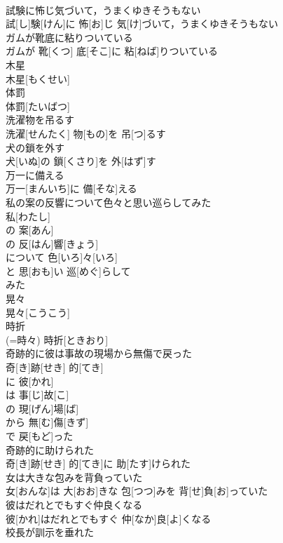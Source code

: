 \documentclass[8pt]{extreport}
\begin{document}
\begin{CJK}{UTF8}{min}
\\	試験に怖じ気づいて，うまくゆきそうもない	
\\	試[し]験[けん]に 怖[お]じ 気[け]づいて，うまくゆきそうもない
\\	ガムが靴底に粘りついている	
\\	ガムが 靴[くつ] 底[そこ]に 粘[ねば]りついている
\\	木星	
\\	木星[もくせい]
\\	体罰	
\\	体罰[たいばつ]
\\	洗濯物を吊るす	
\\	洗濯[せんたく] 物[もの]を 吊[つ]るす
\\	犬の鎖を外す	
\\	犬[いぬ]の 鎖[くさり]を 外[はず]す
\\	万一に備える	
\\	万一[まんいち]に 備[そな]える
\\	私の案の反響について色々と思い巡らしてみた	
\\	私[わたし]
\\	の 案[あん]
\\	の 反[はん]響[きょう]
\\	について 色[いろ]々[いろ]
\\	と 思[おも]い 巡[めぐ]らして 
\\	みた
\\	晃々	
\\	晃々[こうこう]
\\	時折	
\\	(=時々)	時折[ときおり]
\\	奇跡的に彼は事故の現場から無傷で戻った	
\\	奇[き]跡[せき] 的[てき]
\\	に 彼[かれ]
\\	は 事[じ]故[こ]
\\	の 現[げん]場[ば]
\\	から 無[む]傷[きず]
\\	で 戻[もど]った 
\\	奇跡的に助けられた	
\\	奇[き]跡[せき] 的[てき]に 助[たす]けられた
\\	女は大きな包みを背負っていた	
\\	女[おんな]は 大[おお]きな 包[つつ]みを 背[せ]負[お]っていた
\\	彼はだれとでもすぐ仲良くなる	
\\	彼[かれ]はだれとでもすぐ 仲[なか]良[よ]くなる
\\	校長が訓示を垂れた	

\end{CJK}
\end{document}
